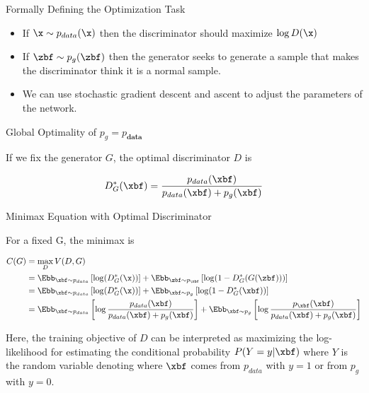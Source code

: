 \documentclass[aspectratio=169,xcolor=dvipsnames,svgnames,x11names,fleqn]{beamer}
\begin{document}
\begin{frame}{Formally Defining the Optimization Task}
    
\begin{block}{}
\begin{itemize}
    \item If $\x \sim p_{data}(\x)$ then the discriminator should maximize $\log D(\x)$
    \item If $\zbf\sim p_g(\zbf)$ then the generator seeks to generate a sample that makes the discriminator think it is a normal sample. 
    \item We can use stochastic gradient descent and ascent to adjust the parameters of the network. 
\end{itemize}
\end{block}

\end{frame}

\begin{frame}{Global Optimality of $p_g = p_{\textbf{data}}$}

If we fix the generator $G$, the optimal discriminator $D$ is

\LARGE 

\begin{align*}
\centering
D^*_G(\xbf) = \frac{p_{data}(\xbf)}{p_{data}(\xbf) + p_g(\xbf)}
\end{align*}

\end{frame}


\begin{frame}{Minimax Equation with Optimal Discriminator}

For a fixed G, the minimax is

\begin{align*}
C(G) & = \max_{D} V (D, G) \\
& =   \Ebb_{\xbf\sim p_{data}}\left[ \log(D_G^*(\x)) \right] + \Ebb_{\zbf\sim p_{\zbf}}\left[\log(1 - D_G^*(G(\zbf)))\right]\\
& =  \Ebb_{\xbf\sim p_{data}}\left[ \log(D_G^*(\x)) \right] + \Ebb_{\xbf\sim p_g}\left[\log(1 - D_G^*(\xbf))\right]\\
& = \Ebb_{\xbf\sim p_{data}}\left[ \log   \frac{p_{data}(\xbf)}{p_{data}(\xbf) + p_g(\xbf)} \right] + \Ebb_{\xbf\sim p_g}\left[\log  \frac{p_{\xbf}(\xbf)}{p_{data}(\xbf) + p_g(\xbf)} \right]
\end{align*}

Here, the training objective of $D$ can be interpreted as maximizing the log-likelihood for estimating the conditional probability $P(Y = y|\xbf)$ where $Y$ is the random variable denoting where $\xbf$ comes from $p_{data}$ with $y=1$ or from $p_g$ with $y=0$.

\end{frame}
\end{document}

